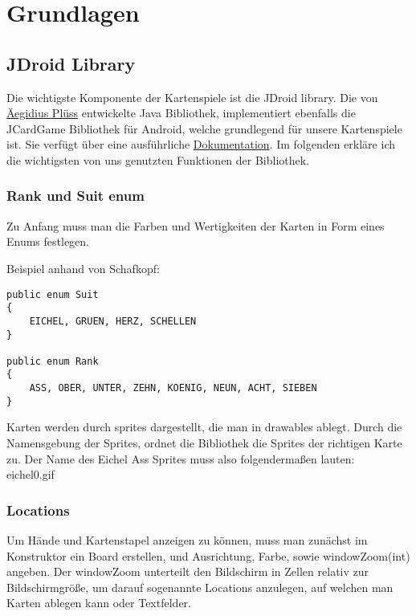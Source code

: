 \chapter{Grundlagen}

\section{JDroid Library}
\sectionauthor{\philipp}

Die wichtigste Komponente der Kartenspiele ist die JDroid library. Die von
\href{http://www.aplu.ch/home/apluhomex.jsp?site=99}{Äegidius Plüss} entwickelte
Java Bibliothek, implementiert ebenfalls die JCardGame Bibliothek für Android,
welche grundlegend für unsere Kartenspiele ist. Sie verfügt über eine
ausführliche
\href{http://www.java-online.ch/gamegrid/index.php?inhalt_links=navigation.inc.php&inhalt_mitte=iframedoc1.html}{Dokumentation}.
Im folgenden erkläre ich die wichtigsten von uns genutzten Funktionen der
Bibliothek.

\subsection{Rank und Suit enum}

Zu Anfang muss man die Farben und Wertigkeiten der Karten in Form eines Enums
festlegen.

Beispiel anhand von Schafkopf:

\begin{lstlisting}
public enum Suit
{
	EICHEL, GRUEN, HERZ, SCHELLEN
}

public enum Rank
{
	ASS, OBER, UNTER, ZEHN, KOENIG, NEUN, ACHT, SIEBEN
}
\end{lstlisting}

Karten werden durch sprites dargestellt, die man in drawables ablegt. Durch die
Namensgebung der Sprites, ordnet die Bibliothek die Sprites der richtigen Karte
zu. Der Name des Eichel Ass Sprites muss also folgendermaßen lauten:\\
eichel0.gif

\subsection{Locations}

Um Hände und Kartenstapel anzeigen zu können, muss man zunächst im Konstruktor
ein Board erstellen, und Ausrichtung, Farbe, sowie windowZoom(int) angeben. Der
windowZoom unterteilt den Bildschirm in Zellen relativ zur Bildschirmgröße, um
darauf sogenannte Locations anzulegen, auf welchen man Karten ablegen kann oder
Textfelder.

